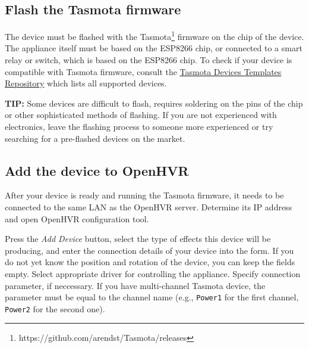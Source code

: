 \subsection*{Flash the Tasmota firmware}

The device must be flashed with the 
Tasmota\footnote{https://github.com/arendst/Tasmota/releases}
firmware on the chip of the device.
The appliance itself must be based on the ESP8266 chip, or connected to a 
smart relay or switch, which is based on the ESP8266 chip. To check if your
device is compatible with Tasmota firmware, consult the 
\href{https://templates.blakadder.com}{Tasmota Devices Templates Repository}
which lists all supported devices.

\textbf{TIP:} Some devices are difficult to flash, requires soldering on the
pins of the chip or other sophisticated methods of flashing. If you are not
experienced with electronics, leave the flashing process to someone
more experienced or try searching for a pre-flashed devices on the market.

\subsection*{Add the device to OpenHVR}

After your device is ready and running the Tasmota firmware, it needs to be
connected to the same LAN as the OpenHVR server. Determine its IP address and
open OpenHVR configuration tool.

Press the \textit{Add Device} button, select the type of effects this device
will be producing, and enter the connection details of your device into
the form. If you do not yet know the position and rotation of the device, you
can keep the fields empty. Select appropriate driver for controlling the
appliance. Specify connection parameter, if neccessary. If you have multi-channel
Tasmota device, the parameter must be equal to the channel name 
(e.g., \verb|Power1| for the first channel, \verb|Power2| for the second one).